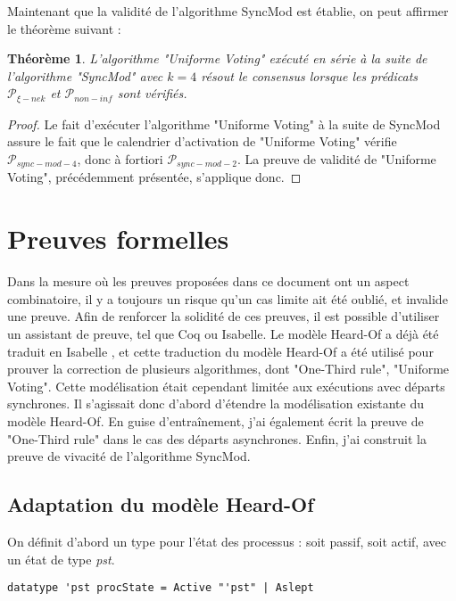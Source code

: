 \documentclass{article}
\newtheorem{theorem}{Théorème}
\begin{document}
Maintenant que la validité de l'algorithme SyncMod est établie, on peut affirmer le théorème suivant :

\begin{theorem}
	L'algorithme "Uniforme Voting" exécuté en série à la suite de l'algorithme "SyncMod" avec $k = 4$
	résout le consensus lorsque les prédicats $\mathcal{P}_{\xi-nek}$ et $\mathcal{P}_{non-inf}$ sont vérifiés.
\end{theorem}
\begin{proof}
	Le fait d'exécuter l'algorithme "Uniforme Voting" à la suite de SyncMod assure le fait que le calendrier d'activation de "Uniforme Voting" vérifie $\mathcal{P}_{sync-mod-4}$,
	donc à fortiori $\mathcal{P}_{sync-mod-2}$.
	La preuve de validité de "Uniforme Voting", précédemment présentée, s'applique donc.
\end{proof}

\section{Preuves formelles}

Dans la mesure où les preuves proposées dans ce document ont un aspect combinatoire, il y a toujours un risque qu'un cas limite ait été oublié, et invalide une preuve.
Afin de renforcer la solidité de ces preuves, il est possible d'utiliser un assistant de preuve, tel que Coq ou Isabelle.
Le modèle Heard-Of a déjà été traduit en Isabelle \cite{HO_isa},
et cette traduction du modèle Heard-Of a été utilisé pour prouver la correction de plusieurs algorithmes, dont "One-Third rule", "Uniforme Voting".
Cette modélisation était cependant limitée aux exécutions avec départs synchrones.
Il s'agissait donc d'abord d'étendre la modélisation existante du modèle Heard-Of.
En guise d'entraînement, j'ai également écrit la preuve de "One-Third rule" dans le cas des départs asynchrones.
Enfin, j'ai construit la preuve de vivacité de l'algorithme SyncMod.

\subsection{Adaptation du modèle Heard-Of}

On définit d'abord un type pour l'état des processus : soit passif, soit actif, avec un état de type \textit{pst}.

\begin{lstlisting}
datatype 'pst procState = Active "'pst" | Aslept
\end{lstlisting}
\end{document}
